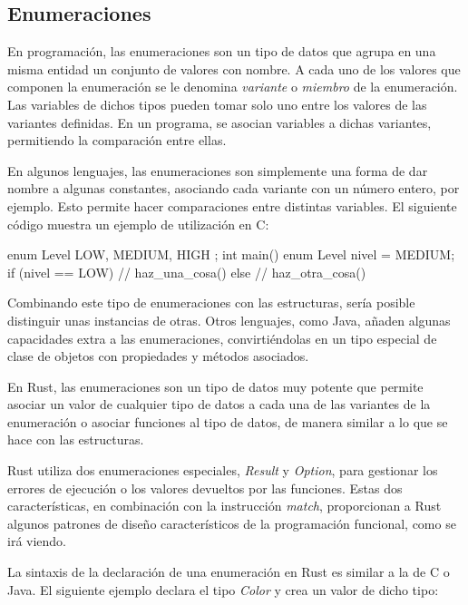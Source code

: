 \subsection{Enumeraciones}
\noindent En programación, las enumeraciones son un tipo de datos que agrupa en una misma entidad un conjunto de valores con nombre. A cada uno de los valores que componen la enumeración se le denomina \textit{variante} o \textit{miembro} de la enumeración. Las variables de dichos tipos pueden tomar solo uno entre los valores de las variantes definidas. En un programa, se asocian variables a dichas variantes, permitiendo la comparación entre ellas.
 
En algunos lenguajes, las enumeraciones son simplemente una forma de dar nombre a algunas constantes, asociando cada variante con un número entero, por ejemplo. Esto permite hacer comparaciones entre distintas variables. El siguiente código muestra un ejemplo de utilización en C:

\vspace{0.7em}
\begin{Codigo}
enum Level {
   LOW,
   MEDIUM,
   HIGH
};
int main() {
   enum Level nivel = MEDIUM;
   if (nivel == LOW) {
      // haz_una_cosa()
   } else {
      // haz_otra_cosa()
   }  
}
\end{Codigo}

Combinando este tipo de enumeraciones con las estructuras, sería posible distinguir unas instancias de otras. Otros lenguajes, como Java, añaden algunas capacidades extra a las enumeraciones, convirtiéndolas en un tipo especial de clase de objetos con propiedades y métodos asociados. 

En Rust, las enumeraciones son un tipo de datos muy potente que permite asociar un valor de cualquier tipo de datos a cada una de las variantes de la enumeración o asociar funciones al tipo de datos, de manera similar a lo que se hace con las estructuras. 

Rust utiliza dos enumeraciones especiales, \textit{Result} y \textit{Option}, para gestionar los errores de ejecución o los valores devueltos por las funciones. Estas dos características, en combinación con la instrucción \textit{match}, proporcionan a Rust algunos patrones de diseño característicos de la programación funcional, como se irá viendo. 

La sintaxis de la declaración de una enumeración en Rust es similar a la de C o Java. El siguiente ejemplo declara el tipo \textit{Color} y crea un valor de dicho tipo:


